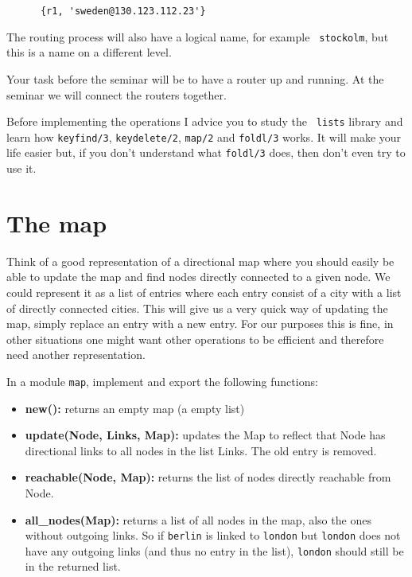 \documentclass[a4paper, 11pt]{article}
\begin{document}
\begin{verbatim}
      {r1, 'sweden@130.123.112.23'}
\end{verbatim}

The routing process will also have a logical name, for example {\tt
  stockolm}, but this is a name on a different level.

Your task before the seminar will be to have a router up and running. At the
seminar we will connect the routers together.

Before implementing the operations I advice you to study the {\tt
  lists} library and learn how {\tt keyfind/3}, {\tt keydelete/2},
{\tt map/2} and {\tt foldl/3} works. It will make your life easier
but, if you don't understand what {\tt foldl/3} does, then don't even
try to use it.

\section{The map}

Think of a good representation of a directional map where you should
easily be able to update the map and find nodes directly connected to
a given node. We could represent it as a list of entries where each
entry consist of a city with a list of directly connected cities. This
will give us a very quick way of updating the map, simply replace an
entry with a new entry. For our purposes this is fine, in other
situations one might want other operations to be efficient and
therefore need another representation.

In a module {\tt map}, implement and export the
following functions:

\begin{itemize}

\item{\bf new():} returns an empty map (a empty list)

\item{\bf update(Node, Links, Map):} updates the Map to reflect that
  Node has directional links to all nodes in the list Links. The old
  entry is removed.

\item{\bf reachable(Node, Map):} returns the list of nodes directly reachable from Node.

\item{\bf all\_nodes(Map):} returns a list of all nodes in the map,
  also the ones without outgoing links. So if {\tt berlin} is linked
  to {\tt london} but {\tt london} does not have any outgoing links
  (and thus no entry in the list), {\tt london} should still be in the
  returned list.
  
\end{itemize}
\end{document}

